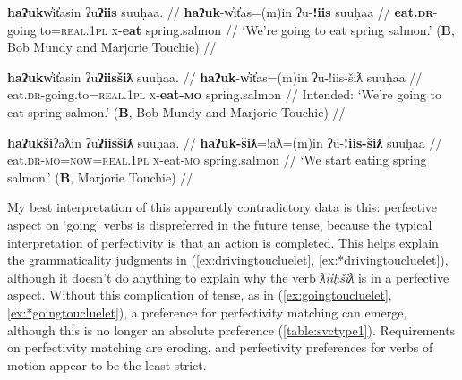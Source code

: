 \ex \label{ex:eateat3}
\begingl
\glpreamble \textbf{haʔuk}w̓it̓asin ʔu\textbf{ʔiis} suuḥaa. //
\gla \textbf{haʔuk}-w̓it̓as=(m)in ʔu-\textbf{!iis} suuḥaa //
\glb \textbf{eat.\textsc{dr}}-going.to=\textsc{real.1pl} \textsc{x}-\textbf{eat} spring.salmon //
\glft `We're going to eat spring salmon.' (\textbf{B}, Bob Mundy and Marjorie Touchie) //
\endgl
\xe

\ex \label{ex:*eateat4}
\begingl
\glpreamble *\textbf{haʔuk}w̓it̓asin ʔu\textbf{ʔiisšiƛ} suuḥaa. //
\gla \textbf{haʔuk}-w̓it̓as=(m)in ʔu-!iis-šiƛ suuḥaa //
\glb eat.\textsc{dr}-going.to=\textsc{real.1pl} \textsc{x}-\textbf{eat-\textsc{mo}} spring.salmon //
\glft Intended: `We're going to eat spring salmon.' (\textbf{B}, Bob Mundy and Marjorie Touchie) //
\endgl
\xe

\ex \label{ex:eateat5}
\begingl
\glpreamble \textbf{haʔukši}ʔaƛin ʔu\textbf{ʔiisšiƛ} suuḥaa. //
\gla \textbf{haʔuk-šiƛ}=!aƛ=(m)in ʔu-\textbf{!iis-šiƛ} suuḥaa //
\glb eat.\textsc{dr}-\textsc{mo}=\textsc{now}=\textsc{real.1pl} \textsc{x}-eat-\textsc{mo} spring.salmon //
\glft `We start eating spring salmon.' (\textbf{B}, Marjorie Touchie) //
\endgl
\xe

My best interpretation of this apparently contradictory data is this: perfective aspect on `going' verbs is dispreferred in the future tense, because the typical interpretation of perfectivity is that an action is completed. This helps explain the grammaticality judgments in (\ref{ex:drivingtoucluelet}, \ref{ex:*drivingtoucluelet}), although it doesn't do anything to explain why the verb \textit{ƛiiḥšiƛ} is in a perfective aspect. Without this complication of tense, as in (\ref{ex:goingtoucluelet}, \ref{ex:*goingtoucluelet}), a preference for perfectivity matching can emerge, although this is no longer an absolute preference (\cref{table:svctype1}). Requirements on perfectivity matching are eroding, and perfectivity preferences for verbs of motion appear to be the least strict.

